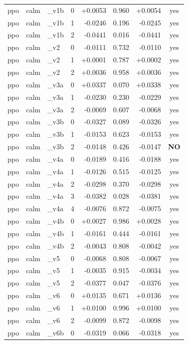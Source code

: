 \documentclass[11pt]{article}
\begin{document}
\begin{center}
\begin{longtable}{lllrrrrc}
ppo & calm & \_v1b & 0 & +0.0053 & 0.960 & +0.0054 & yes \\
ppo & calm & \_v1b & 1 & -0.0246 & 0.196 & -0.0245 & yes \\
ppo & calm & \_v1b & 2 & -0.0441 & 0.016 & -0.0441 & yes \\
ppo & calm & \_v2 & 0 & -0.0111 & 0.732 & -0.0110 & yes \\
ppo & calm & \_v2 & 1 & +0.0001 & 0.787 & +0.0002 & yes \\
ppo & calm & \_v2 & 2 & +0.0036 & 0.958 & +0.0036 & yes \\
ppo & calm & \_v3a & 0 & +0.0337 & 0.070 & +0.0338 & yes \\
ppo & calm & \_v3a & 1 & -0.0230 & 0.230 & -0.0229 & yes \\
ppo & calm & \_v3a & 2 & -0.0069 & 0.607 & -0.0068 & yes \\
ppo & calm & \_v3b & 0 & -0.0327 & 0.089 & -0.0326 & yes \\
ppo & calm & \_v3b & 1 & -0.0153 & 0.623 & -0.0153 & yes \\
ppo & calm & \_v3b & 2 & -0.0148 & 0.426 & -0.0147 & \textbf{NO} \\
ppo & calm & \_v4a & 0 & -0.0189 & 0.416 & -0.0188 & yes \\
ppo & calm & \_v4a & 1 & -0.0126 & 0.515 & -0.0125 & yes \\
ppo & calm & \_v4a & 2 & -0.0298 & 0.370 & -0.0298 & yes \\
ppo & calm & \_v4a & 3 & -0.0382 & 0.028 & -0.0381 & yes \\
ppo & calm & \_v4a & 4 & -0.0076 & 0.872 & -0.0075 & yes \\
ppo & calm & \_v4b & 0 & +0.0027 & 0.986 & +0.0028 & yes \\
ppo & calm & \_v4b & 1 & -0.0161 & 0.444 & -0.0161 & yes \\
ppo & calm & \_v4b & 2 & -0.0043 & 0.808 & -0.0042 & yes \\
ppo & calm & \_v5 & 0 & -0.0068 & 0.808 & -0.0067 & yes \\
ppo & calm & \_v5 & 1 & -0.0035 & 0.915 & -0.0034 & yes \\
ppo & calm & \_v5 & 2 & -0.0377 & 0.047 & -0.0376 & yes \\
ppo & calm & \_v6 & 0 & +0.0135 & 0.671 & +0.0136 & yes \\
ppo & calm & \_v6 & 1 & +0.0100 & 0.996 & +0.0100 & yes \\
ppo & calm & \_v6 & 2 & -0.0099 & 0.872 & -0.0098 & yes \\
ppo & calm & \_v6b & 0 & -0.0319 & 0.066 & -0.0318 & yes \\

\end{longtable}
\end{center}
\end{document}
